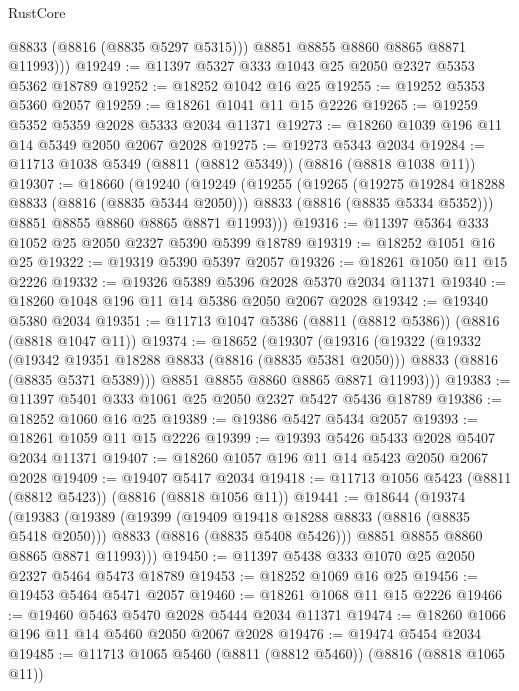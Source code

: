 \begin{lexlean}{RustCore}
\begin{coremodule}
            @8833
            (@8816 (@8835 @5297 @5315)))
          @8851
          @8855
          @8860
          @8865
          @8871
          @11993)))
@19249 := @11397 @5327 @333 @1043 @25 @2050 @2327 @5353 @5362 @18789
@19252 := @18252 @1042 @16 @25
@19255 := @19252 @5353 @5360 @2057
@19259 := @18261 @1041 @11 @15 @2226
@19265 := @19259 @5352 @5359 @2028 @5333 @2034 @11371
@19273 := @18260 @1039 @196 @11 @14 @5349 @2050 @2067 @2028
@19275 := @19273 @5343 @2034
@19284 := @11713 @1038 @5349 (@8811 (@8812 @5349)) (@8816 (@8818 @1038 @11))
@19307 := @18660
    (@19240
      (@19249
        (@19255
          (@19265
            (@19275 @19284 @18288 @8833 (@8816 (@8835 @5344 @2050)))
            @8833
            (@8816 (@8835 @5334 @5352)))
          @8851
          @8855
          @8860
          @8865
          @8871
          @11993)))
@19316 := @11397 @5364 @333 @1052 @25 @2050 @2327 @5390 @5399 @18789
@19319 := @18252 @1051 @16 @25
@19322 := @19319 @5390 @5397 @2057
@19326 := @18261 @1050 @11 @15 @2226
@19332 := @19326 @5389 @5396 @2028 @5370 @2034 @11371
@19340 := @18260 @1048 @196 @11 @14 @5386 @2050 @2067 @2028
@19342 := @19340 @5380 @2034
@19351 := @11713 @1047 @5386 (@8811 (@8812 @5386)) (@8816 (@8818 @1047 @11))
@19374 := @18652
    (@19307
      (@19316
        (@19322
          (@19332
            (@19342 @19351 @18288 @8833 (@8816 (@8835 @5381 @2050)))
            @8833
            (@8816 (@8835 @5371 @5389)))
          @8851
          @8855
          @8860
          @8865
          @8871
          @11993)))
@19383 := @11397 @5401 @333 @1061 @25 @2050 @2327 @5427 @5436 @18789
@19386 := @18252 @1060 @16 @25
@19389 := @19386 @5427 @5434 @2057
@19393 := @18261 @1059 @11 @15 @2226
@19399 := @19393 @5426 @5433 @2028 @5407 @2034 @11371
@19407 := @18260 @1057 @196 @11 @14 @5423 @2050 @2067 @2028
@19409 := @19407 @5417 @2034
@19418 := @11713 @1056 @5423 (@8811 (@8812 @5423)) (@8816 (@8818 @1056 @11))
@19441 := @18644
    (@19374
      (@19383
        (@19389
          (@19399
            (@19409 @19418 @18288 @8833 (@8816 (@8835 @5418 @2050)))
            @8833
            (@8816 (@8835 @5408 @5426)))
          @8851
          @8855
          @8860
          @8865
          @8871
          @11993)))
@19450 := @11397 @5438 @333 @1070 @25 @2050 @2327 @5464 @5473 @18789
@19453 := @18252 @1069 @16 @25
@19456 := @19453 @5464 @5471 @2057
@19460 := @18261 @1068 @11 @15 @2226
@19466 := @19460 @5463 @5470 @2028 @5444 @2034 @11371
@19474 := @18260 @1066 @196 @11 @14 @5460 @2050 @2067 @2028
@19476 := @19474 @5454 @2034
@19485 := @11713 @1065 @5460 (@8811 (@8812 @5460)) (@8816 (@8818 @1065 @11))

\end{coremodule}
\end{lexlean}

